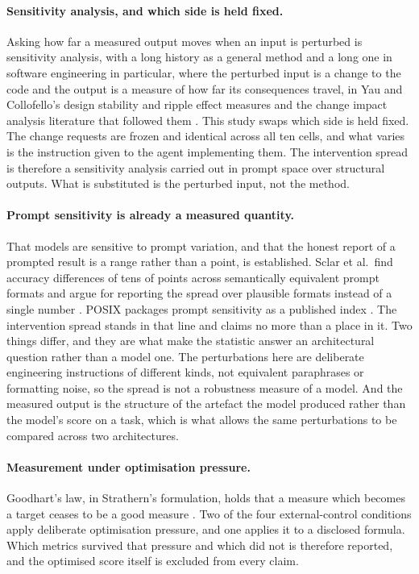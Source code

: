 \documentclass[11pt,a4paper]{article}
\begin{document}
\paragraph{Sensitivity analysis, and which side is held fixed.} Asking how far
a measured output moves when an input is perturbed is sensitivity analysis, with
a long history as a general method \cite{saltelli2008} and a long one in
software engineering in particular, where the perturbed input is a change to the
code and the output is a measure of how far its consequences travel, in Yau and
Collofello's design stability and ripple effect measures \cite{yau1985} and the
change impact analysis literature that followed them \cite{bohner1996}. This
study swaps which side is held fixed. The change requests are frozen and
identical across all ten cells, and what varies is the instruction given to
the agent implementing them. The intervention spread is therefore a sensitivity
analysis carried out in prompt space over structural outputs. What is
substituted is the perturbed input, not the method.

\paragraph{Prompt sensitivity is already a measured quantity.} That models are
sensitive to prompt variation, and that the honest report of a prompted result
is a range rather than a point, is established. Sclar et al.\ find accuracy
differences of tens of points across semantically equivalent prompt
formats and argue for reporting the spread over plausible formats instead of a
single number \cite{formatspread}. POSIX packages prompt sensitivity as a
published index \cite{posix}. The intervention spread stands in that line and
claims no more than a place in it. Two things differ, and they are what make the
statistic answer an architectural question rather than a model one. The
perturbations here are deliberate engineering instructions of different kinds,
not equivalent paraphrases or formatting noise, so the spread is not a
robustness measure of a model. And the measured output is the structure of the
artefact the model produced rather than the model's score on a task, which is
what allows the same perturbations to be compared across two architectures.

\paragraph{Measurement under optimisation pressure.} Goodhart's law, in
Strathern's formulation, holds that a measure which becomes a target ceases to
be a good measure \cite{goodhart1975, strathern1997}. Two of the four
external-control conditions apply deliberate optimisation pressure, and one
applies it to a disclosed formula. Which metrics survived that pressure and which
did not is therefore reported, and the optimised score itself is excluded from
every claim.
\end{document}
